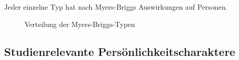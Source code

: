 Jeder einzelne Typ hat nach Myers-Briggs Auswirkungen auf Personen. \cite{myers_myers_2002} 
\lipsum[0-3]
\begin{figure}[htbp!]
	\centering
	\caption[Verteilung der Myers-Briggs-Typen]{Verteilung der Myers-Briggs-Typen \cite{myers_myers_2002}}
	\label{img:mbti_distribution}
\end{figure}

\subsection{Studienrelevante Persönlichkeitscharaktere}
